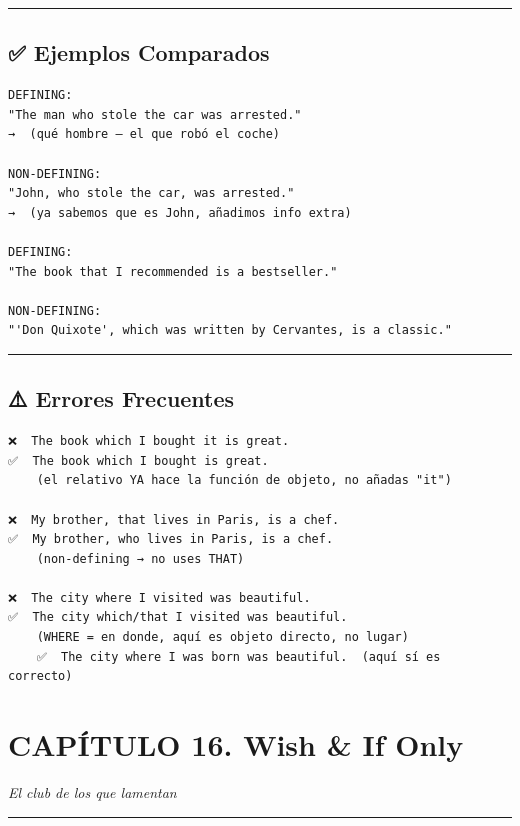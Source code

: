 \documentclass[
  spanish,
  letterpaper,
]{scrbook}
\begin{document}
\begin{center}\rule{0.5\linewidth}{0.5pt}\end{center}

\section{✅ Ejemplos Comparados}\label{ejemplos-comparados-1}

\begin{verbatim}
DEFINING:
"The man who stole the car was arrested."
→  (qué hombre — el que robó el coche)

NON-DEFINING:
"John, who stole the car, was arrested."
→  (ya sabemos que es John, añadimos info extra)

DEFINING:
"The book that I recommended is a bestseller."

NON-DEFINING:
"'Don Quixote', which was written by Cervantes, is a classic."
\end{verbatim}

\begin{center}\rule{0.5\linewidth}{0.5pt}\end{center}

\section{⚠️ Errores Frecuentes}\label{errores-frecuentes-1}

\begin{verbatim}
❌  The book which I bought it is great.
✅  The book which I bought is great.
    (el relativo YA hace la función de objeto, no añadas "it")

❌  My brother, that lives in Paris, is a chef.
✅  My brother, who lives in Paris, is a chef.
    (non-defining → no uses THAT)

❌  The city where I visited was beautiful.
✅  The city which/that I visited was beautiful.
    (WHERE = en donde, aquí es objeto directo, no lugar)
    ✅  The city where I was born was beautiful.  (aquí sí es correcto)
\end{verbatim}

\chapter{CAPÍTULO 16. Wish \& If
Only}\label{capuxedtulo-16.-wish-if-only}

\emph{El club de los que lamentan}

\begin{center}\rule{0.5\linewidth}{0.5pt}\end{center}
\end{document}
